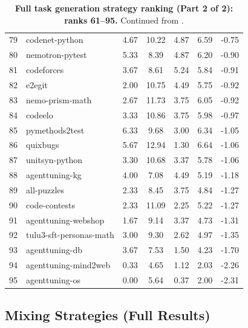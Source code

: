 \documentclass{llmxive}
\begin{document}
\begin{table}[!htbp]
\begin{tabular}{rlccccc}
79 & codenet-python                 &  4.67 & 10.22 &  4.87 &  6.59 & -0.75 \\
80 & nemotron-pytest                &  5.33 &  8.39 &  4.87 &  6.20 & -0.90 \\
81 & codeforces                     &  3.67 &  8.61 &  5.24 &  5.84 & -0.91 \\
82 & e2egit                         &  2.00 & 10.75 &  4.49 &  5.75 & -0.92 \\
83 & nemo-prism-math                &  2.67 & 11.73 &  3.75 &  6.05 & -0.92 \\
84 & codeelo                        &  3.33 & 10.86 &  3.75 &  5.98 & -0.97 \\
85 & pymethods2test                 &  6.33 &  9.68 &  3.00 &  6.34 & -1.05 \\
86 & quixbugs                       &  5.67 & 12.94 &  1.30 &  6.64 & -1.06 \\
87 & unitsyn-python                 &  3.30 & 10.68 &  3.37 &  5.78 & -1.06 \\
88 & agenttuning-kg                 &  4.00 &  7.08 &  4.49 &  5.19 & -1.18 \\
89 & all-puzzles                    &  2.33 &  8.45 &  3.75 &  4.84 & -1.27 \\
90 & code-contests                  &  2.33 & 11.09 &  2.25 &  5.22 & -1.27 \\
91 & agenttuning-webshop            &  1.67 &  9.14 &  3.37 &  4.73 & -1.31 \\
92 & tulu3-sft-personas-math        &  3.00 &  9.30 &  2.62 &  4.97 & -1.35 \\
93 & agenttuning-db                 &  3.67 &  7.53 &  1.50 &  4.23 & -1.70 \\
94 & agenttuning-mind2web           &  0.33 &  4.65 &  1.12 &  2.03 & -2.26 \\
95 & agenttuning-os                 &  0.00 &  5.64 &  0.37 &  2.00 & -2.31 \\
\bottomrule
\end{tabular}
\vspace{10pt}
\caption{\textbf{Full task generation strategy ranking (Part 2 of 2): ranks 61--95.} Continued from .}
\label{tab:task_gen_full_part2}
\end{table}
\FloatBarrier

\subsection{Mixing Strategies (Full Results)}
\label{app:mixing-full}
\end{document}
